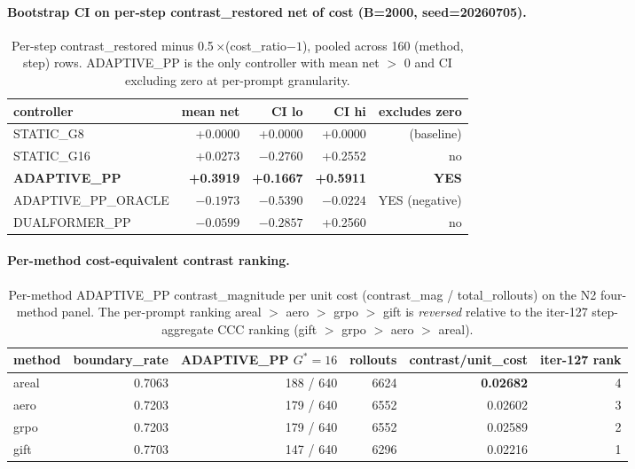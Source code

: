 \documentclass{article}
\begin{document}
\paragraph{Bootstrap CI on per-step contrast\_restored net of cost
(B=2000, seed=20260705).}

\begin{table}[h]
\centering\small
\caption{Per-step contrast\_restored minus 0.5\,$\times$(cost\_ratio$-1$),
pooled across 160 (method, step) rows. ADAPTIVE\_PP is the only controller
with mean net $>$ 0 and CI excluding zero at per-prompt granularity.}
\label{tab:p7-iter131-bootstrap-ci}
\begin{tabular}{lrrrr}
\toprule
controller & mean net & CI lo & CI hi & excludes zero \\
\midrule
STATIC\_G8               & +0.0000 & +0.0000 & +0.0000 & (baseline) \\
STATIC\_G16              & +0.0273 & $-0.2760$ & +0.2552 & no          \\
\textbf{ADAPTIVE\_PP}    & \textbf{+0.3919} & \textbf{+0.1667} & \textbf{+0.5911} & \textbf{YES} \\
ADAPTIVE\_PP\_ORACLE     & $-0.1973$ & $-0.5390$ & $-0.0224$ & YES (negative) \\
DUALFORMER\_PP           & $-0.0599$ & $-0.2857$ & +0.2560 & no \\
\bottomrule
\end{tabular}
\end{table}

\paragraph{Per-method cost-equivalent contrast ranking.}

\begin{table}[h]
\centering\small
\caption{Per-method ADAPTIVE\_PP contrast\_magnitude per unit cost
(contrast\_mag / total\_rollouts) on the N2 four-method panel. The per-prompt
ranking areal $>$ aero $>$ grpo $>$ gift is \emph{reversed} relative to the
iter-127 step-aggregate CCC ranking (gift $>$ grpo $>$ aero $>$ areal).}
\label{tab:p7-iter131-method-ranking}
\begin{tabular}{lrrrrr}
\toprule
method & boundary\_rate & ADAPTIVE\_PP $G^*=16$ & rollouts & contrast/unit\_cost & iter-127 rank \\
\midrule
areal  & 0.7063 & 188 / 640 & 6624 & \textbf{0.02682} & 4 \\
aero   & 0.7203 & 179 / 640 & 6552 & 0.02602         & 3 \\
grpo   & 0.7203 & 179 / 640 & 6552 & 0.02589         & 2 \\
gift   & 0.7703 & 147 / 640 & 6296 & 0.02216         & 1 \\
\bottomrule
\end{tabular}
\end{table}
\end{document}
